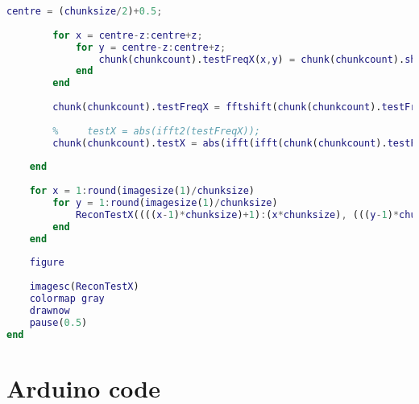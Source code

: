\begin{lstlisting}[language=Matlab, label = lst:chunk_comp, caption = {Secioned image, transform based compression code}]
        centre = (chunksize/2)+0.5;
        
        for x = centre-z:centre+z;
            for y = centre-z:centre+z;
                chunk(chunkcount).testFreqX(x,y) = chunk(chunkcount).shiftedFreqX(x,y);
            end
        end
        
        chunk(chunkcount).testFreqX = fftshift(chunk(chunkcount).testFreqX);
        
        %     testX = abs(ifft2(testFreqX));
        chunk(chunkcount).testX = abs(ifft(ifft(chunk(chunkcount).testFreqX)')');
        
    end
    
    for x = 1:round(imagesize(1)/chunksize)
        for y = 1:round(imagesize(1)/chunksize)
            ReconTestX((((x-1)*chunksize)+1):(x*chunksize), (((y-1)*chunksize)+1):(y*chunksize)) = chunk(x,y).testX;
        end
    end
    
    figure
    
    imagesc(ReconTestX)
    colormap gray
    drawnow
    pause(0.5)
end
\end{lstlisting}

\section{Arduino code}



